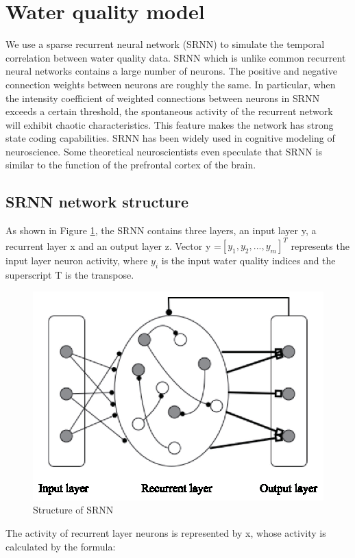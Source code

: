 \documentclass[runningheads]{llncs}
\begin{document}
\section{Water quality model}
We use a sparse recurrent neural network (SRNN)
to simulate the temporal correlation between water quality data. 
SRNN which is unlike common recurrent neural networks contains a 
large number of neurons. The positive and negative connection 
weights between neurons are roughly the same. In particular, 
when the intensity coefficient of weighted connections between 
neurons in SRNN exceeds a certain threshold, the spontaneous activity 
of the recurrent network will exhibit chaotic characteristics\cite{RN17}. 
This feature makes the network has strong state coding capabilities. 
SRNN has been widely used in cognitive modeling of neuroscience. 
Some theoretical neuroscientists even speculate that SRNN is similar 
to the function of the prefrontal cortex of the brain\cite{RN18}.
\subsection{SRNN network structure}
As shown in Figure \ref{Structure of SRNN}, 
the SRNN contains three layers, an input layer y, a recurrent layer x and an output layer z.
Vector y =$\left[y_1,y_2,...,y_m\right]^T$ represents the input layer neuron activity,
 where $y_i$ is the input water quality indices and the superscript T is the transpose.

\begin{figure}[htbp]
\centering
\includegraphics[width=0.7\columnwidth]{Fig1_structure_of_SRNN}
\caption{Structure of SRNN}
\label{Structure of SRNN}
\end{figure}

The activity of recurrent layer neurons is represented by x, 
whose activity is calculated by the formula:
\end{document}
